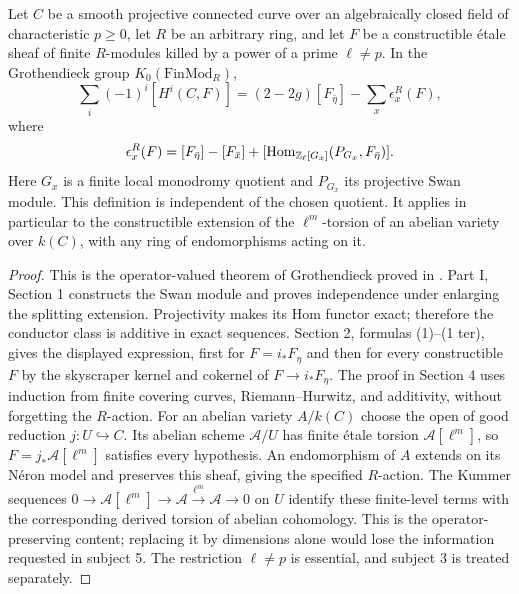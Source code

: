 \begin{theorem}\label{thm:B3-operators}
Let $C$ be a smooth projective connected curve over an algebraically
closed field of characteristic $p\ge0$, let $R$ be an arbitrary ring,
and let $F$ be a constructible \'etale sheaf of finite $R$-modules
killed by a power of a prime $\ell\ne p$. In the Grothendieck group
$K_0(\mathrm{FinMod}_R)$,
\[
 \sum_i(-1)^i[H^i(C,F)]
   =(2-2g)[F_{\bar\eta}]-\sum_x\epsilon_x^R(F),
\]
where
\[
 \epsilon_x^R(F)=
 [F_{\bar\eta}]-[F_{\bar x}]
 +[\operatorname{Hom}_{{\mathbb{Z}}_\ell[G_x]}(P_{G_x},F_{\bar\eta})].
\]
Here $G_x$ is a finite local monodromy quotient and $P_{G_x}$ its
projective Swan module. This definition is independent of the
chosen quotient. It applies in particular to the constructible
extension of the $\ell^m$-torsion of an abelian variety over $k(C)$,
with any ring of endomorphisms acting on it.
\end{theorem}
\begin{proof}
This is the operator-valued theorem of Grothendieck proved in
\cite[Part I, Theorem 1, p.~133]{BRaynaud1966}. Part I, Section 1
constructs the Swan module and proves independence under enlarging
the splitting extension. Projectivity makes its Hom functor exact;
therefore the conductor class is additive in exact sequences.
Section 2, formulas (1)--(1 ter), gives the displayed expression,
first for $F=i_*F_\eta$ and then for every constructible $F$ by the
skyscraper kernel and cokernel of $F\to i_*F_\eta$.
The proof in Section 4 uses induction from finite covering curves,
Riemann--Hurwitz, and additivity, without forgetting the $R$-action.
For an abelian variety $A/k(C)$ choose the open of good reduction
$j:U\hookrightarrow C$. Its abelian scheme $\mathcal A/U$ has finite
\'etale torsion $\mathcal A[\ell^m]$, so
$F=j_*\mathcal A[\ell^m]$ satisfies every hypothesis.
An endomorphism of $A$ extends on its N\'eron model and preserves this
sheaf, giving the specified $R$-action. The Kummer sequences
$0\to\mathcal A[\ell^m]\to\mathcal A\xrightarrow{\ell^m}
\mathcal A\to0$ on $U$ identify these finite-level terms with the
corresponding derived torsion of abelian cohomology. This is the
operator-preserving content; replacing it by dimensions alone would
lose the information requested in subject 5. The restriction
$\ell\ne p$ is essential, and subject 3 is treated separately.
\end{proof}

